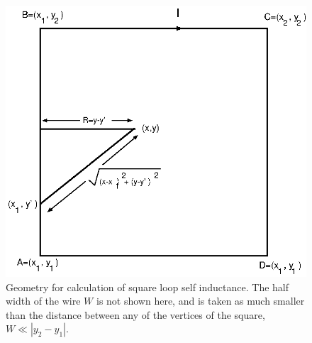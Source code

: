 \begin{figure}[p]
\includegraphics{figs/pme_theory/selfindgeom.eps}
\caption[Geometry for calculation of square loop self inductance.]
{Geometry for calculation of square loop self inductance. The half width of 
the wire $W$ is not shown here, and is taken as much smaller than the 
distance between any of the vertices of the square, \ie\ 
$W\ll \left|y_2 - y_1\right|$. }
\label{fig:self_ind_geometry}
\end{figure}

